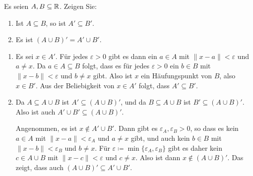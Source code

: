 \documentclass[a4paper,10pt]{article}
\begin{document}
\begin{question}
 Es seien $A, B \subseteq \mathbb{R}$. Zeigen Sie:
 \begin{enumerate}
  \item
   Ist $A \subseteq B$, so ist $A' \subseteq B'$.
  \item
   Es ist $(A \cup B)' = A' \cup B'$.
 \end{enumerate}
\end{question}
\begin{solution}
 \begin{enumerate}
  \item
   Es sei $x \in A'$. Für jedes $\varepsilon > 0$ gibt es dann ein $a \in A$ mit $\|x-a\| < \varepsilon$ und $a \neq x$. Da $a \in A \subseteq B$ folgt, dass es für jedes $\varepsilon > 0$ ein $b \in B$ mit $\|x-b\| < \varepsilon$ und $b \neq x$ gibt. Also ist $x$ ein Häufungspunkt von $B$, also $x \in B'$. Aus der Beliebigkeit von $x \in A'$ folgt, dass $A' \subseteq B'$.
  \item
   Da $A \subseteq A \cup B$ ist $A' \subseteq (A \cup B)'$, und da $B \subseteq A \cup B$ ist $B' \subseteq (A \cup B)'$. Also ist auch $A' \cup B' \subseteq (A \cup B)'$.
   
   Angenommen, es ist $x \notin A' \cup B'$. Dann gibt es $\varepsilon_A, \varepsilon_B > 0$, so dass es kein $a \in A$ mit $\|x-a\| < \varepsilon_A$ und $a \neq x$ gibt, und auch kein $b \in B$ mit $\|x-b\| < \varepsilon_B$ und $b \neq x$. Für $\varepsilon \coloneqq \min\{\varepsilon_A, \varepsilon_B\}$ gibt es daher kein $c \in A \cup B$ mit $\|x-c\| < \varepsilon$ und $c \neq x$. Also ist dann $x \notin (A \cup B)'$. Das zeigt, dass auch $(A \cup B)' \subseteq A' \cup B'$.
  \qedhere
 \end{enumerate}
\end{solution}
\end{document}
